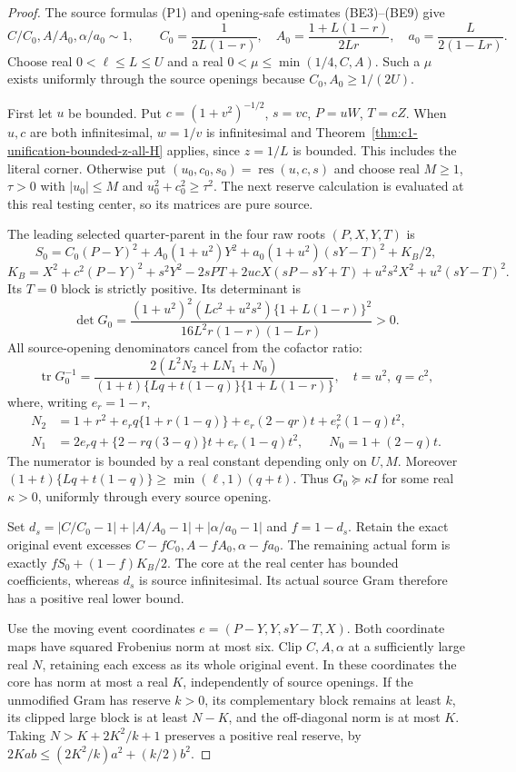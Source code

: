 \begin{proof}
The source formulas (P1) and opening-safe estimates (BE3)--(BE9) give
\[
 C/C_0,A/A_0,\alpha/a_0\sim1,\qquad
 C_0=\frac1{2L(1-r)},\quad
 A_0=\frac{1+L(1-r)}{2Lr},\quad
 a_0=\frac L{2(1-Lr)}.
\]
Choose real $0<\ell\le L\le U$ and a real
$0<\mu\le\min(1/4,C,A)$. Such a $\mu$ exists uniformly through
the source openings because $C_0,A_0\ge1/(2U)$.

First let $u$ be bounded. Put
$c=(1+v^2)^{-1/2}$, $s=vc$, $P=uW$, $T=cZ$.
When $u,c$ are both infinitesimal, $w=1/v$ is infinitesimal and
Theorem~\ref{thm:c1-unification-bounded-z-all-H} applies, since
$z=1/L$ is bounded. This includes the literal corner.
Otherwise put $(u_0,c_0,s_0)=\operatorname{res}(u,c,s)$ and choose
real $M\ge1$, $\tau>0$ with $|u_0|\le M$ and
$u_0^2+c_0^2\ge\tau^2$. The next reserve calculation is evaluated
at this real testing center, so its matrices are pure source.

The leading selected quarter-parent in the four raw roots $(P,X,Y,T)$ is
\[
 S_0=C_0(P-Y)^2+A_0(1+u^2)Y^2
                   +a_0(1+u^2)(sY-T)^2+K_B/2,
\]
\[
 K_B=X^2+c^2(P-Y)^2+s^2Y^2-2sPT
 +2ucX(sP-sY+T)+u^2s^2X^2+u^2(sY-T)^2.
\]
Its $T=0$ block is strictly positive. Its determinant is
\[
 \det G_0=\frac{(1+u^2)^2(Lc^2+u^2s^2)
                 \{1+L(1-r)\}^2}{16L^2r(1-r)(1-Lr)}>0.
\]
All source-opening denominators cancel from the cofactor ratio:
\[
 \operatorname{tr}G_0^{-1}
 =\frac{2(L^2N_2+LN_1+N_0)}
 {(1+t)\{Lq+t(1-q)\}\{1+L(1-r)\}},\quad t=u^2,\ q=c^2,
\]
where, writing $e_r=1-r$,
\begin{align*}
 N_2&=1+r^2+e_rq\{1+r(1-q)\}+e_r(2-qr)t+e_r^2(1-q)t^2,\\
 N_1&=2e_rq+\{2-rq(3-q)\}t+e_r(1-q)t^2,\qquad
 N_0=1+(2-q)t.
\end{align*}
The numerator is bounded by a real constant depending only on $U,M$.
Moreover $(1+t)\{Lq+t(1-q)\}\ge\min(\ell,1)(q+t)$.
Thus $G_0\succeq\kappa I$ for some real $\kappa>0$, uniformly
through every source opening.

Set $d_s=|C/C_0-1|+|A/A_0-1|+|\alpha/a_0-1|$ and $f=1-d_s$.
Retain the exact original event excesses $C-fC_0,A-fA_0,\alpha-fa_0$.
The remaining actual form is exactly $fS_0+(1-f)K_B/2$.
The core at the real center has bounded coefficients, whereas $d_s$
is source infinitesimal. Its actual source Gram therefore has a
positive real lower bound.

Use the moving event coordinates $e=(P-Y,Y,sY-T,X)$.
Both coordinate maps have squared Frobenius norm at most six.
Clip $C,A,\alpha$ at a sufficiently large real $N$, retaining each
excess as its whole original event. In these coordinates the core
has norm at most a real $K$, independently of source openings.
If the unmodified Gram has reserve $k>0$, its complementary block
remains at least $k$, its clipped large block is at least $N-K$,
and the off-diagonal norm is at most $K$. Taking
$N>K+2K^2/k+1$ preserves a positive real reserve, by
$2Kab\le(2K^2/k)a^2+(k/2)b^2$.


\end{proof}
